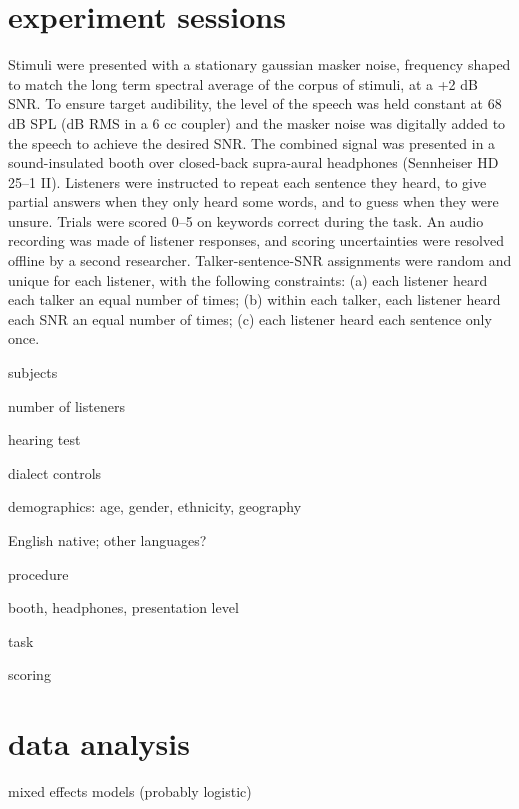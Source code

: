 \section{experiment sessions}
Stimuli were presented with a stationary gaussian masker noise, frequency shaped to match the long term spectral average of the corpus of stimuli, at a +2 dB SNR.  To ensure target audibility, the level of the speech was held constant at 68 dB SPL (dB RMS in a 6 cc coupler) and the masker noise was digitally added to the speech to achieve the desired SNR.  The combined signal was presented in a sound-insulated booth over closed-back supra-aural headphones (Sennheiser HD 25–1 II).  Listeners were instructed to repeat each sentence they heard, to give partial answers when they only heard some words, and to guess when they were unsure.  Trials were scored 0–5 on keywords correct during the task.  An audio recording was made of listener responses, and scoring uncertainties were resolved offline by a second researcher.  Talker-sentence-SNR assignments were random and unique for each listener, with the following constraints: (a) each listener heard each talker an equal number of times; (b) within each talker, each listener heard each SNR an equal number of times; (c) each listener heard each sentence only once.

\begin{itm}
	\item{subjects}
	\begin{itm}
		\item{number of listeners}
		\item{hearing test}
		\item{dialect controls}
		\item{demographics: age, gender, ethnicity, geography}
		\item{English native; other languages?}
	\end{itm}
	\item{procedure}
	\begin{itm}
		\item{booth, headphones, presentation level}
		\item{task}
		\item{scoring}
	\end{itm}
\end{itm}

\section{data analysis}
\begin{itm}
	\item{mixed effects models (probably logistic)}
\end{itm}
